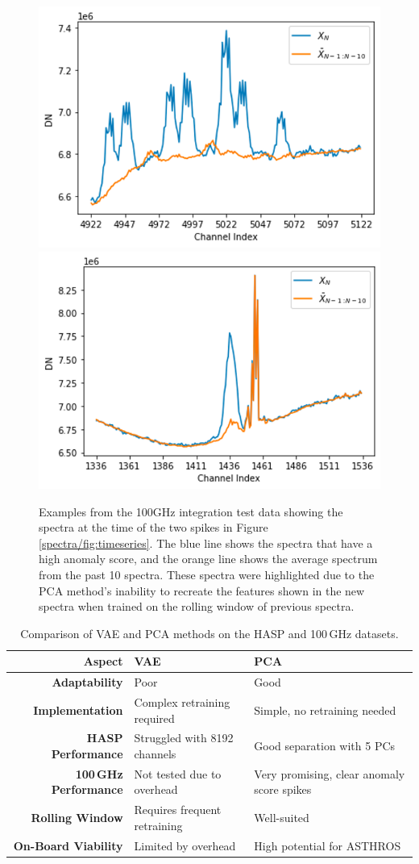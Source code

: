\begin{figure}[t]
    \centering
    \includegraphics[width=0.49\linewidth]{figs/spectra/pca1.png}
    \includegraphics[width=0.49\linewidth]{figs/spectra/pca2.png}
    \caption[Novel Examples from the 100GHz Integration Test]{Examples from the 100GHz integration test data showing the spectra at the time of the two spikes in Figure \ref{spectra/fig:timeseries}. The blue line shows the spectra that have a high anomaly score, and the orange line shows the average spectrum from the past 10 spectra. These spectra were highlighted due to the PCA method's inability to recreate the features shown in the new spectra when trained on the rolling window of previous spectra.}
    \label{spectra/fig:100ghz}
\end{figure}

\begin{table}
    \centering
    \begin{tabularx}{\textwidth}{r|L|L}
        \textbf{Aspect} & \textbf{VAE} & \textbf{PCA} \\
        \hline
        \textbf{Adaptability} & Poor & Good \\
        \textbf{Implementation} & Complex retraining required & Simple, no retraining needed \\
        \textbf{HASP Performance} & Struggled with 8192 channels & Good separation with 5 PCs \\
        \textbf{100\,GHz Performance} & Not tested due to overhead & Very promising, clear anomaly score spikes \\
        \textbf{Rolling Window} & Requires frequent retraining & Well-suited \\
        \textbf{On-Board Viability} & Limited by overhead & High potential for ASTHROS \\
    \end{tabularx}
    \caption{Comparison of VAE and PCA methods on the HASP and 100\,GHz datasets.}
    \label{spectra/tab:method_comparison}
\end{table}

